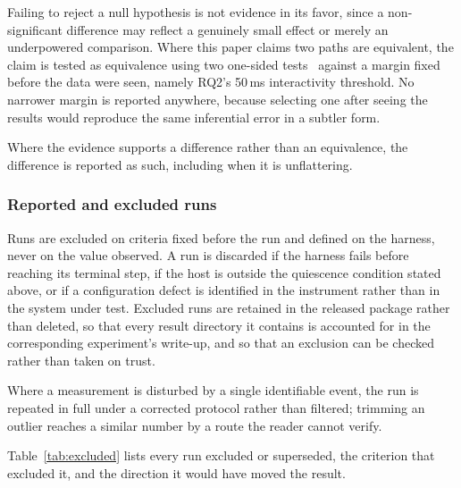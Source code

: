 \documentclass[preprint,12pt]{elsarticle}
\begin{document}
Failing to reject a null hypothesis is not evidence in its favor, since a
non-significant difference may reflect a genuinely small effect or merely an
underpowered comparison. Where this paper claims two paths are equivalent, the
claim is tested as equivalence using two one-sided
tests~\cite{schuirmann1987tost} against a margin fixed before the data were
seen, namely RQ2's 50\,ms interactivity threshold. No narrower margin is
reported anywhere, because selecting one after seeing the results would
reproduce the same inferential error in a subtler form.

Where the evidence supports a difference rather than an equivalence, the
difference is reported as such, including when it is unflattering.

\subsubsection*{Reported and excluded runs}

Runs are excluded on criteria fixed before the run and defined on the
harness, never on the value observed. A run is discarded if the harness fails
before reaching its terminal step, if the host is outside the quiescence
condition stated above, or if a configuration defect is identified in the
instrument rather than in the system under test. Excluded runs are retained in
the released package rather than deleted, so that every result directory it
contains is accounted for in the corresponding experiment's write-up, and so
that an exclusion can be checked rather than taken on trust.

Where a measurement is disturbed by a single identifiable event, the run is
repeated in full under a corrected protocol rather than filtered; trimming an
outlier reaches a similar number by a route the reader cannot verify.

Table~\ref{tab:excluded} lists every run excluded or superseded, the criterion
that excluded it, and the direction it would have moved the result.
\end{document}

